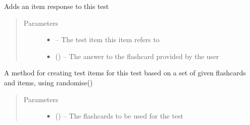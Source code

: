 \documentclass[letterpaper,10pt,english]{sphinxmanual}
\begin{document}
\begin{fulllineitems}
\begin{fulllineitems}
\end{fulllineitems}


\begin{fulllineitems}
\label{\detokenize{test:test.Test.append_item}}
Adds an item response to this test
\begin{quote}\begin{description}
\item[{Parameters}] \leavevmode\begin{itemize}
\item {} 
 -- The test item this item refers to

\item {} 
 (\href{https://docs.python.org/2/library/string.html\#module-string}{}) -- The answer to the flashcard provided by the user

\end{itemize}

\end{description}\end{quote}

\end{fulllineitems}


\begin{fulllineitems}
\label{\detokenize{test:test.Test.generate_test}}
A method for creating test items for this test based on a set of given flashcards and items, using randomise()
\begin{quote}\begin{description}
\item[{Parameters}] \leavevmode\begin{itemize}
\item {} 
 (\href{https://docs.python.org/2/library/functions.html\#list}{}\sphinxstyleliteralemphasis{)}\sphinxstyleliteralemphasis{}) -- The flashcards to be used for the test


\end{itemize}
\end{description}
\end{quote}
\end{fulllineitems}
\end{fulllineitems}
\end{document}
